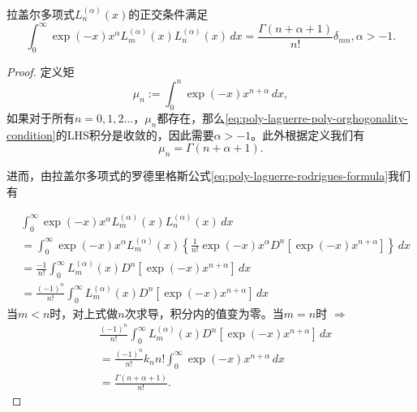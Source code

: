\begin{subappendices}
\begin{theorem}[拉盖尔多项式的正交条件]
  拉盖尔多项式$L^{(\alpha)}_n(x)$的正交条件满足
  \begin{equation}
    \label{eq:poly-laguerre-poly-orghogonality-condition}
    \int_0^{\infty} \exp(-x) x^{\alpha} L_m^{(\alpha)}(x) L_n^{(\alpha)}(x) \, dx = \frac{\Gamma(n+\alpha+1)}{n!} \delta_{mn}, \alpha > -1.
  \end{equation}
\end{theorem}
\begin{proof}
  定义矩
\begin{equation*}
  \mu_n := \int_0^{n} \exp(-x) x^{n+\alpha} \, dx,
\end{equation*}
如果对于所有$n=0,1,2\ldots$，$\mu_n$都存在，那么\eqref{eq:poly-laguerre-poly-orghogonality-condition}的LHS积分是收敛的，因此需要$\alpha > -1$。此外根据定义我们有
\begin{equation*}
  \mu_n = \Gamma (n+\alpha + 1).
\end{equation*}

进而，由拉盖尔多项式的罗德里格斯公式\eqref{eq:poly-laguerre-rodrigues-formula}我们有

\begin{equation*}
  \begin{split}
    &\int_0^{\infty} \exp(-x) x^{\alpha} L_m^{(\alpha)}(x) L_n^{(\alpha)}(x) \, dx
    \\&= \int_0^{\infty} \exp(-x) x^{\alpha} L_m^{(\alpha)}(x) \left\{
    \frac{1}{n!} \exp(-x) x^{\alpha} D^n \left[ \exp(-x) x^{n+\alpha} \right]
    \right\} \, dx \\
    &= \frac{-1}{n!} \int_0^{\infty} L_m^{(\alpha)} (x) D^n \left[ \exp(-x) x^{n+\alpha}  \right] \, dx \\
    &= \frac{(-1)^n}{n!} \int_0^{\infty} L_m^{(\alpha)} (x) D^n \left[ \exp(-x) x^{n+\alpha}  \right] \, dx
  \end{split}
\end{equation*}
当$m<n$时，对上式做$n$次求导，积分内的值变为零。当$m=n$时 $\Rightarrow$
\begin{equation*}
  \begin{split}
    &\frac{(-1)^n}{n!} \int_0^{\infty} L_m^{(\alpha)} (x) D^n \left[ \exp(-x) x^{n+\alpha}  \right] \, dx \\
    &= \frac{(-1)^n}{n!} k_n n! \int_0^{\infty} \exp(-x) x^{n+\alpha} \, dx \\
    &= \frac{\Gamma (n+\alpha + 1)}{n!}.
  \end{split}
\end{equation*}
\end{proof}


\end{subappendices}
